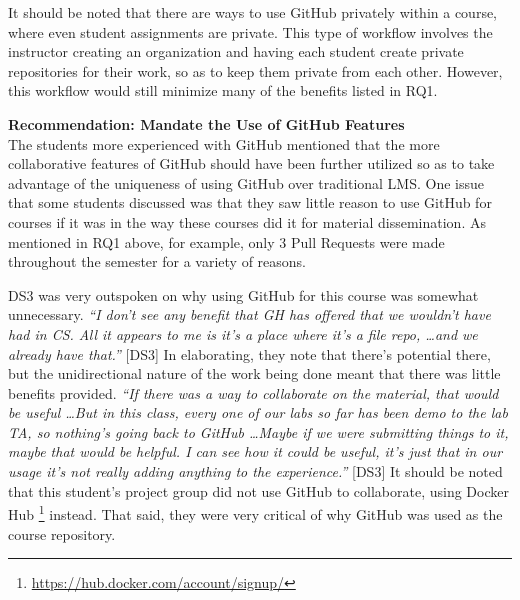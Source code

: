 It should be noted that there are ways to use GitHub privately within a course, where even student assignments are private. This type of workflow involves the instructor creating an organization and having each student create private repositories for their work, so as to keep them private from each other. However, this workflow would still minimize many of the benefits listed in RQ1.


\textbf{Recommendation: Mandate the Use of GitHub Features} \\
The students more experienced with GitHub mentioned that the more collaborative features of GitHub should have been further utilized so as to take advantage of the uniqueness of using GitHub over traditional LMS. One issue that some students discussed was that they saw little reason to use GitHub for courses if it was in the way these courses did it for material dissemination. As mentioned in RQ1 above, for example, only 3 Pull Requests were made throughout the semester for a variety of reasons.

DS3 was very outspoken on why using GitHub for this course was somewhat unnecessary. \textit{``I don't see any benefit that GH has offered that we wouldn't have had in CS. All it appears to me is it's a place where it's a file repo, \ldots and we already have that.''} [DS3] In elaborating, they note that there's potential there, but the unidirectional nature of the work being done meant that there was little benefits provided. \textit{``If there was a way to collaborate on the material, that would be useful \ldots But in this class, every one of our labs so far has been demo to the lab TA, so nothing's going back to GitHub \ldots Maybe if we were submitting things to it, maybe that would be helpful. I can see how it could be useful, it's just that in our usage it's not really adding anything to the experience.''} [DS3] It should be noted that this student's project group did not use GitHub to collaborate, using Docker Hub \footnote{\url{https://hub.docker.com/account/signup/}} instead. That said, they were very critical of why GitHub was used as the course repository.

